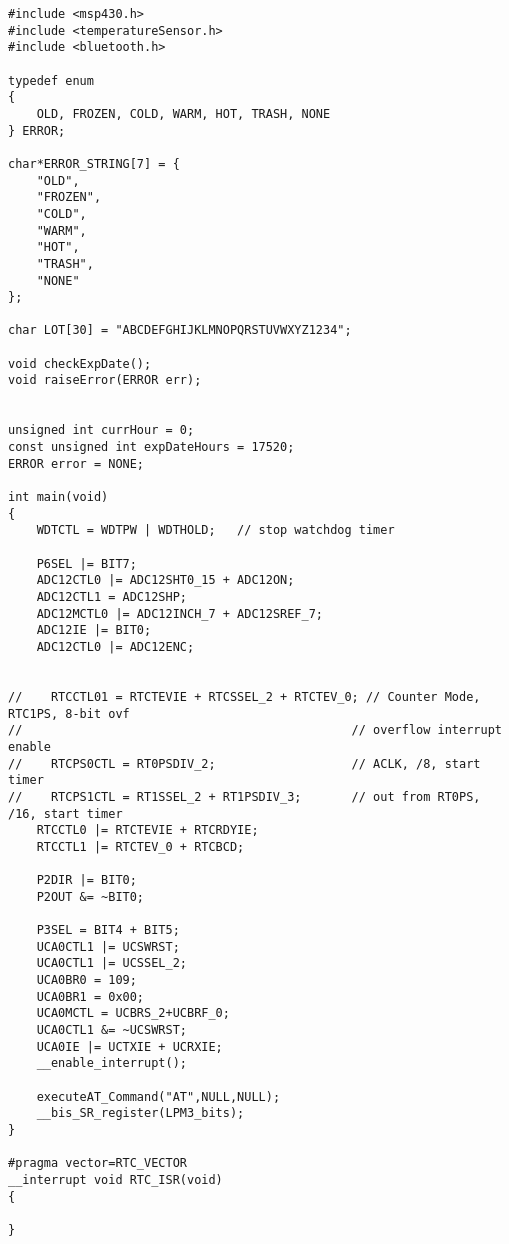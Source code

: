 \begin{verbatim}
#include <msp430.h> 
#include <temperatureSensor.h>
#include <bluetooth.h>

typedef enum
{
    OLD, FROZEN, COLD, WARM, HOT, TRASH, NONE
} ERROR;

char*ERROR_STRING[7] = {
    "OLD",
    "FROZEN",
    "COLD",
    "WARM",
    "HOT",
    "TRASH",
    "NONE"
};

char LOT[30] = "ABCDEFGHIJKLMNOPQRSTUVWXYZ1234";

void checkExpDate();
void raiseError(ERROR err);


unsigned int currHour = 0;
const unsigned int expDateHours = 17520;
ERROR error = NONE;

int main(void)
{
    WDTCTL = WDTPW | WDTHOLD;	// stop watchdog timer

    P6SEL |= BIT7;
    ADC12CTL0 |= ADC12SHT0_15 + ADC12ON;
    ADC12CTL1 = ADC12SHP;
    ADC12MCTL0 |= ADC12INCH_7 + ADC12SREF_7;
    ADC12IE |= BIT0;
    ADC12CTL0 |= ADC12ENC;


//    RTCCTL01 = RTCTEVIE + RTCSSEL_2 + RTCTEV_0; // Counter Mode, RTC1PS, 8-bit ovf
//                                              // overflow interrupt enable
//    RTCPS0CTL = RT0PSDIV_2;                   // ACLK, /8, start timer
//    RTCPS1CTL = RT1SSEL_2 + RT1PSDIV_3;       // out from RT0PS, /16, start timer
    RTCCTL0 |= RTCTEVIE + RTCRDYIE;
    RTCCTL1 |= RTCTEV_0 + RTCBCD;

    P2DIR |= BIT0;
    P2OUT &= ~BIT0;

    P3SEL = BIT4 + BIT5;
    UCA0CTL1 |= UCSWRST;
    UCA0CTL1 |= UCSSEL_2;
    UCA0BR0 = 109;
    UCA0BR1 = 0x00;
    UCA0MCTL = UCBRS_2+UCBRF_0;
    UCA0CTL1 &= ~UCSWRST;
    UCA0IE |= UCTXIE + UCRXIE;
    __enable_interrupt();

    executeAT_Command("AT",NULL,NULL);
    __bis_SR_register(LPM3_bits);
}

#pragma vector=RTC_VECTOR
__interrupt void RTC_ISR(void)
{

}


\end{verbatim}

